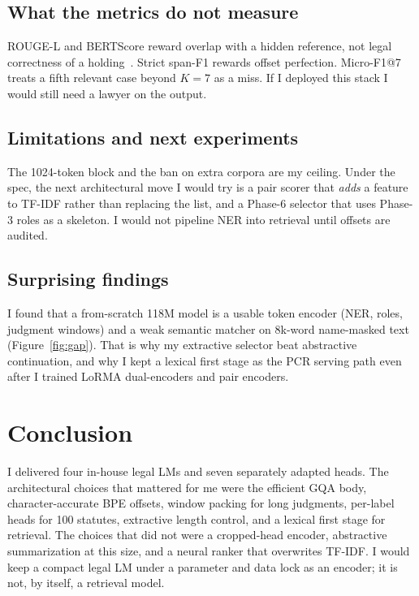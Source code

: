 \documentclass[11pt, oneside]{article}
\begin{document}
\subsection{What the metrics do not measure}
ROUGE-L and BERTScore reward overlap with a hidden reference, not legal correctness of a holding~\cite{lin2004rouge,zhang2020bertscore}. Strict span-F1 rewards offset perfection. Micro-F1@7 treats a fifth relevant case beyond $K{=}7$ as a miss. If I deployed this stack I would still need a lawyer on the output.

\subsection{Limitations and next experiments}
The 1024-token block and the ban on extra corpora are my ceiling. Under the spec, the next architectural move I would try is a pair scorer that \emph{adds} a feature to TF-IDF rather than replacing the list, and a Phase-6 selector that uses Phase-3 roles as a skeleton. I would not pipeline NER into retrieval until offsets are audited.

\subsection{Surprising findings}
I found that a from-scratch 118M model is a usable token encoder (NER, roles, judgment windows) and a weak semantic matcher on 8k-word name-masked text (Figure~\ref{fig:gap}). That is why my extractive selector beat abstractive continuation, and why I kept a lexical first stage as the PCR serving path even after I trained LoRMA dual-encoders and pair encoders.

\section{Conclusion}
I delivered four in-house legal LMs and seven separately adapted heads. The architectural choices that mattered for me were the efficient GQA body, character-accurate BPE offsets, window packing for long judgments, per-label heads for 100 statutes, extractive length control, and a lexical first stage for retrieval. The choices that did not were a cropped-head encoder, abstractive summarization at this size, and a neural ranker that overwrites TF-IDF. I would keep a compact legal LM under a parameter and data lock as an encoder; it is not, by itself, a retrieval model.
\end{document}
